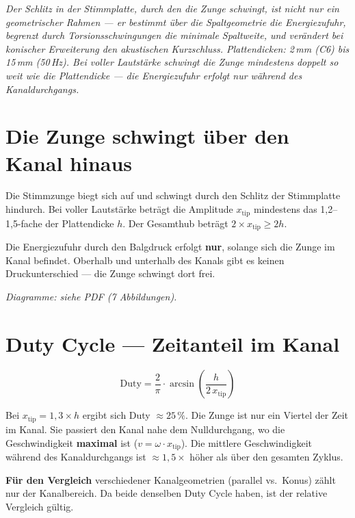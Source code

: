 \documentclass[11pt,a4paper]{article}
\begin{document}
\hbmaketitle

{\small\itshape Der Schlitz in der Stimmplatte, durch den die Zunge schwingt, ist nicht nur ein geometrischer Rahmen --- er bestimmt über die Spaltgeometrie die Energiezufuhr, begrenzt durch Torsionsschwingungen die minimale Spaltweite, und verändert bei konischer Erweiterung den akustischen Kurzschluss. Plattendicken: 2\,mm (C6) bis 15\,mm (50\,Hz). Bei voller Lautstärke schwingt die Zunge mindestens doppelt so weit wie die Plattendicke --- die Energiezufuhr erfolgt nur während des Kanaldurchgangs.}

\vspace{4mm}

\section{Die Zunge schwingt über den Kanal hinaus}

Die Stimmzunge biegt sich auf und schwingt durch den Schlitz der Stimmplatte hindurch. Bei voller Lautstärke beträgt die Amplitude $x_\text{tip}$ mindestens das 1,2--1,5-fache der Plattendicke $h$. Der Gesamthub beträgt $2 \times x_\text{tip} \geq 2h$.

Die Energiezufuhr durch den Balgdruck erfolgt \textbf{nur}, solange sich die Zunge im Kanal befindet. Oberhalb und unterhalb des Kanals gibt es keinen Druckunterschied --- die Zunge schwingt dort frei.

\textit{Diagramme: siehe PDF (7 Abbildungen).}

\section{Duty Cycle --- Zeitanteil im Kanal}

\begin{equation}
\text{Duty} = \frac{2}{\pi} \cdot \arcsin\!\left(\frac{h}{2\,x_\text{tip}}\right)
\end{equation}

Bei $x_\text{tip} = 1{,}3 \times h$ ergibt sich Duty $\approx 25\,\%$. Die Zunge ist nur ein Viertel der Zeit im Kanal. Sie passiert den Kanal nahe dem Nulldurchgang, wo die Geschwindigkeit \textbf{maximal} ist ($v = \omega \cdot x_\text{tip}$). Die mittlere Geschwindigkeit während des Kanaldurchgangs ist $\approx 1{,}5\times$ höher als über den gesamten Zyklus.

\begin{keybox}
\textbf{Für den Vergleich} verschiedener Kanalgeometrien (parallel vs.\ Konus) zählt nur der Kanalbereich. Da beide denselben Duty Cycle haben, ist der relative Vergleich gültig.
\end{keybox}
\end{document}

